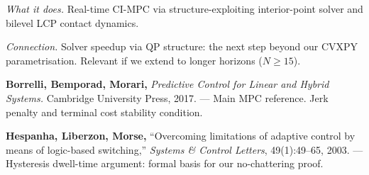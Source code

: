 \documentclass[12pt,a4paper]{article}
\begin{document}
\begin{enumerate}[label={[\arabic*]}, leftmargin=1.5cm, itemsep=10pt]
  \textit{What it does.}
  Real-time CI-MPC via structure-exploiting interior-point solver and
  bilevel LCP contact dynamics.

  \textit{Connection.}
  Solver speedup via QP structure: the next step beyond our CVXPY
  parametrisation. Relevant if we extend to longer horizons ($N \geq 15$).

  \medskip

  \item \textbf{Borrelli, Bemporad, Morari,} \textit{Predictive Control for
    Linear and Hybrid Systems.} Cambridge University Press, 2017. ---
    Main MPC reference. Jerk penalty and terminal cost stability condition.

  \item \textbf{Hespanha, Liberzon, Morse,} ``Overcoming limitations of
    adaptive control by means of logic-based switching,''
    \textit{Systems \& Control Letters}, 49(1):49--65, 2003. ---
    Hysteresis dwell-time argument: formal basis for our no-chattering proof.

\end{enumerate}
\end{document}
